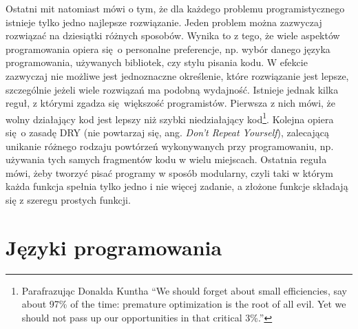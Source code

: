 \documentclass[paper=6in:9in,pagesize=pdftex,headinclude=on,footinclude=on,10pt]{scrbook}
\begin{document}
Ostatni mit natomiast mówi o tym, że dla każdego problemu programistycznego istnieje tylko jedno najlepsze rozwiązanie.
Jeden problem można zazwyczaj rozwiązać na dziesiątki różnych sposobów.
Wynika to z tego, że wiele aspektów programowania opiera się~o personalne preferencje, np. wybór danego języka programowania, używanych bibliotek, czy stylu pisania kodu.
W efekcie zazwyczaj nie możliwe jest jednoznaczne określenie, które rozwiązanie jest lepsze, szczególnie jeżeli wiele rozwiązań ma podobną wydajność.
Istnieje jednak kilka reguł, z którymi zgadza się~większość programistów.
Pierwsza z nich mówi, że wolny działający kod jest lepszy niż szybki niedziałający kod\footnote{Parafrazując Donalda Kuntha ``We should forget about small efficiencies, say about 97\% of the time: premature optimization is the root of all evil. Yet we should not pass up our opportunities in that critical 3\%.''}.
Kolejna opiera się~o zasadę DRY (nie powtarzaj się, ang. \emph{Don't Repeat Yourself}), zalecającą unikanie różnego rodzaju powtórzeń wykonywanych przy programowaniu, np. używania tych samych fragmentów kodu w wielu miejscach.
Ostatnia reguła mówi, żeby tworzyć pisać programy w sposób modularny, czyli taki w którym każda funkcja spełnia tylko jedno i nie więcej zadanie, a złożone funkcje składają się z szeregu prostych funkcji.

\hypertarget{jezyki-programowania}{%
\section{Języki programowania}\label{jezyki-programowania}}
\end{document}
